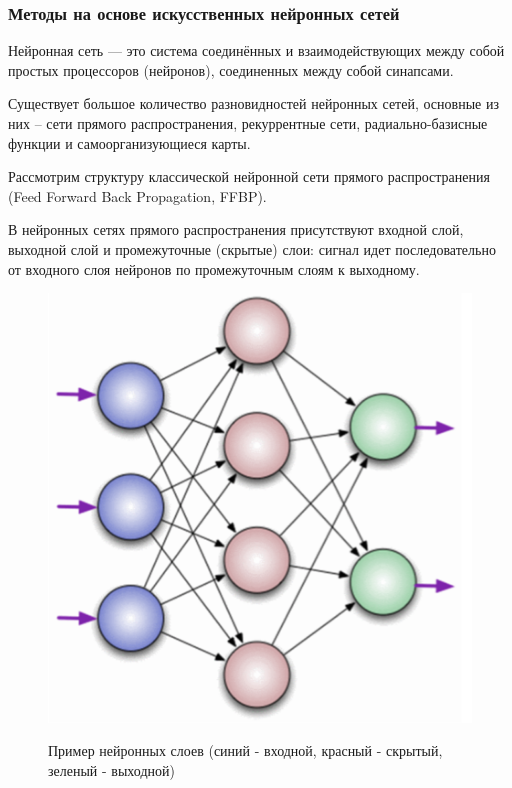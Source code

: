 \documentclass[utf8x, 14pt, oneside, a4paper]{article}
\begin{document}
	
	\subsubsection{Методы на основе искусственных нейронных сетей}
	
	Нейронная сеть — это система соединённых и взаимодействующих между собой простых процессоров (нейронов), соединенных между собой синапсами.
	
	Существует большое количество разновидностей нейронных сетей, основные из них – сети прямого распространения, рекуррентные сети,  радиально-базисные функции и самоорганизующиеся карты.
	
	Рассмотрим структуру классической нейронной сети прямого распространения (Feed Forward Back Propagation, FFBP).
	
	В нейронных сетях прямого распространения присутствуют входной слой, выходной слой и промежуточные (скрытые) слои: сигнал идет последовательно от входного слоя нейронов по промежуточным слоям к выходному. 
	
	\begin{figure}[h!]
		\begin{center}
			{\includegraphics[scale = 0.6]{img/nn.png}}
		\end{center}
		\caption{Пример нейронных слоев (синий - входной, красный - скрытый, зеленый - выходной)}
		\label{ris:nn}
	\end{figure}
\end{document}
